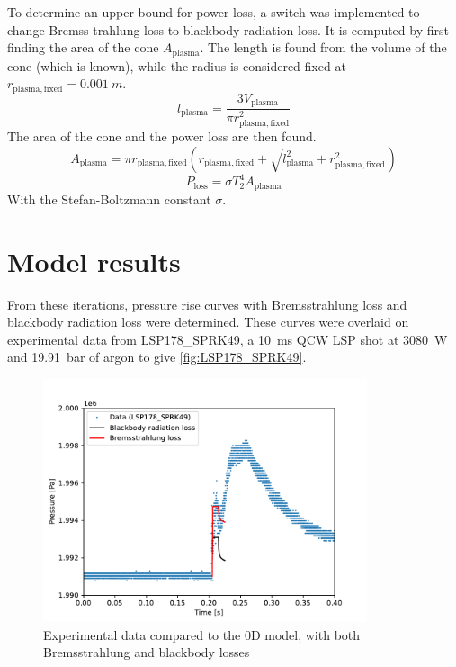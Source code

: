         To determine an upper bound for power loss, a switch was implemented to change Bremss-trahlung loss to blackbody radiation loss. It is computed by first finding the area of the cone $A_\mathrm{plasma}$. The length is found from the volume of the cone (which is known), while the radius is considered fixed at $r_\mathrm{plasma, fixed} = \qty{0.001}{m}$.
        \begin{equation}
            l_\mathrm{plasma} = \frac{3 V_\mathrm{plasma}}{\pi r_\mathrm{plasma, fixed}^2}
        \end{equation}
        The area of the cone and the power loss are then found. 
        \begin{equation}
            A_\mathrm{plasma} = \pi r_\mathrm{plasma, fixed} ( r_\mathrm{plasma, fixed} + \sqrt{l_\mathrm{plasma}^2 + r_\mathrm{plasma, fixed}^2})
        \end{equation}
        \begin{equation}
            P_\mathrm{loss} = \sigma T_2^4 A_\mathrm{plasma}
        \end{equation}
        With the Stefan-Boltzmann constant $\sigma$.
    \section{Model results}

        From these iterations, pressure rise curves with Bremsstrahlung loss and blackbody radiation loss were determined. These curves were overlaid on experimental data from LSP178\_SPRK49, a \qty{10}{ms} QCW LSP shot at \qty{3080}{W} and \qty{19.91}{bar} of argon to give \autoref{fig:LSP178_SPRK49}.
        
        \begin{figure}[!ht]
            \centering
            \includegraphics[width=0.85\textwidth]{assets/2 models/LSP178_SPRK49.pdf}
            \caption{Experimental data compared to the 0D model, with both Bremsstrahlung and blackbody losses}
            \label{fig:LSP178_SPRK49}
        \end{figure}
        
